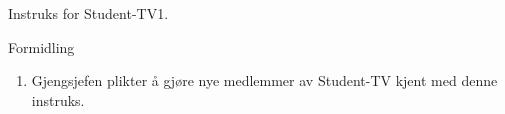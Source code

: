 \begin{instruks}{Instruks for Student-TV}{1. }{}
    \begin{instruksledd}{Formidling}
        \begin{enumerate}
            \item Gjengsjefen plikter å gjøre nye medlemmer av Student-TV kjent med denne
                instruks.
        \end{enumerate}
    \end{instruksledd}


\end{instruks}


